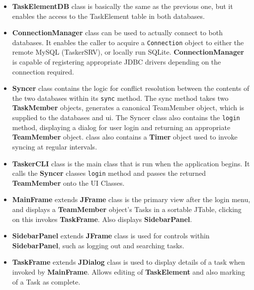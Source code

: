 \begin{itemize}
  		\item \textbf{TaskElementDB} class is basically the same as the previous one, but it enables the access to the TaskElement table in both databases.
  		\item \textbf{ConnectionManager} class can be used to actually connect to both databases. It enables the caller to acquire a \texttt{Connection} object to either the remote MySQL (TaskerSRV), or locally run SQLite. \textbf{ConnectionManager} is capable of registering appropriate JDBC drivers depending on the connection required. 
        \item \textbf{Syncer} class contains the logic for conflict resolution between the contents of the two databases within its \texttt{sync} method. The sync method takes two \textbf{TaskMember} objects, generates a canonical TeamMember object, which is supplied to the databases and ui. The Syncer class also contains the \texttt{login} method, displaying a dialog for user login and returning an appropriate \textbf{TeamMember} object.
        class also contains a \textbf{Timer} object used to invoke syncing at regular intervals.
        \item \textbf{TaskerCLI} class is the main class that is run when the application begins. It calls the \textbf{Syncer} classes \texttt{login} method and passes the returned \textbf{TeamMember} onto the UI Classes.
        \item \textbf{MainFrame} extends \textbf{JFrame} class is the primary view after the login menu, and displays a \textbf{TeamMember} object's Tasks in a sortable JTable, clicking on this invokes \textbf{TaskFrame}. Also displays \textbf{SidebarPanel}.
        \item \textbf{SidebarPanel} extends \textbf{JFrame} class is used for controls within \textbf{SidebarPanel}, such as logging out and searching tasks.
        \item \textbf{TaskFrame} extends \textbf{JDialog} class is used to display details of a task when invoked by \textbf{MainFrame}. Allows editing of \textbf{TaskElement} and also marking of a Task as complete.
  \end{itemize}
  
  

  
